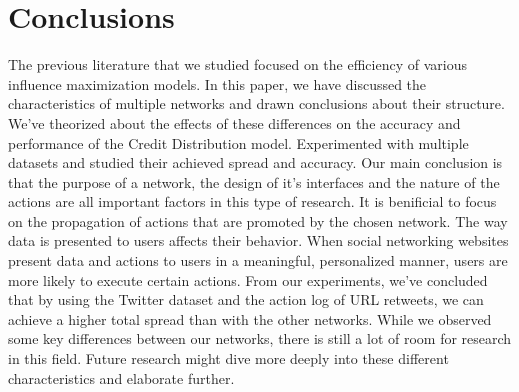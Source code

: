 \documentclass{acm_proc_article-sp}
\begin{document}
\section{Conclusions}

The previous literature that we studied focused on the efficiency of various influence maximization models. In this paper, we have discussed the characteristics of multiple networks and drawn conclusions about their structure. We've theorized about the effects of these differences on the accuracy and performance of the Credit Distribution model. Experimented with multiple datasets and studied their achieved spread and accuracy.  Our main conclusion is that the purpose of a network, the design of it's interfaces and the nature of the actions are all important factors in this type of research. It is benificial to focus on the propagation of actions that are promoted by the chosen network. The way data is presented to users affects their behavior. When social networking websites present data and actions to users in a meaningful, personalized manner, users are more likely to execute certain actions. From our experiments, we've concluded that by using the Twitter dataset and the action log of URL retweets, we can achieve a higher total spread than with the other networks. While we observed some key differences between our networks, there is still a lot of room for research in this field. Future research might dive more deeply into these different characteristics and elaborate further.


%

%

\balancecolumns
\end{document}
